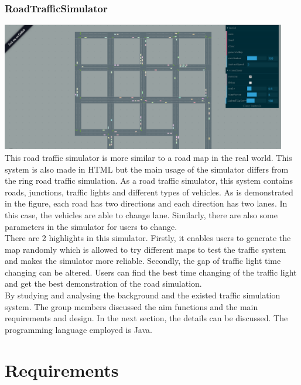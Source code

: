 \documentclass[a4paper,12pt]{article}
\begin{document}
\subsubsection{RoadTrafficSimulator}
\includegraphics[width=12.5cm]{RoadTrafficSimulator.eps}\\
This road traffic simulator is more similar to a road map in the real world. This system is also made in HTML but the main usage of the simulator differs from the ring road traffic simulation. As a road traffic simulator, this system contains roads, junctions, traffic lights and different types of vehicles.
As is demonstrated in the figure, each road has two directions and each direction has two lanes. In this case, the vehicles are able to change lane. Similarly, there are also some parameters in the simulator for users to change.\\
There are 2 highlights in this simulator. Firstly, it enables users to generate the map randomly which is allowed to try different maps to test the traffic system and makes the simulator more reliable. Secondly, the gap of traffic light time changing can be altered. Users can find the best time changing of the traffic light and get the best demonstration of the road simulation.\\
By studying and analysing the background and the existed traffic simulation system. The group members discussed the aim functions and the main requirements and design. In the next section, the details can be discussed. The programming language employed is Java.\\

\section{Requirements}
\end{document}
